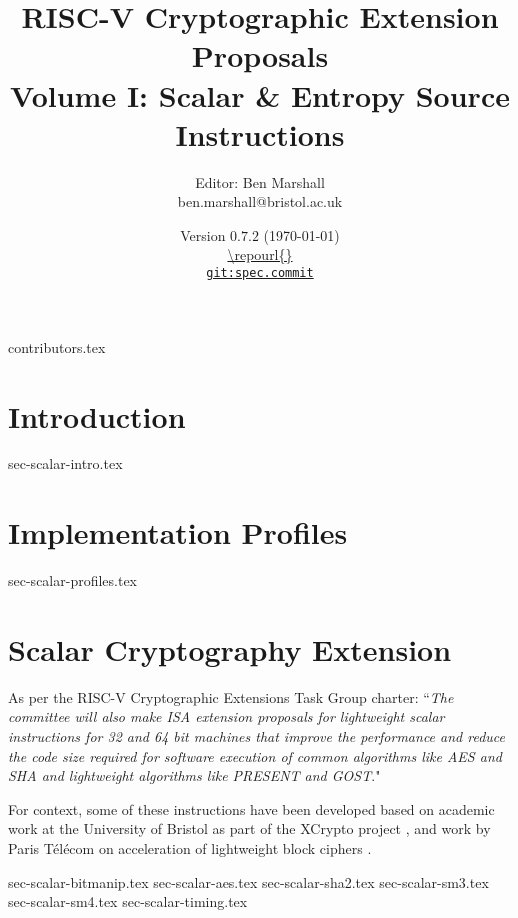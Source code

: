 \documentclass[11pt]{article}
\title{RISC-V Cryptographic Extension Proposals\\Volume I: Scalar \& Entropy Source Instructions}
\author{Editor: Ben Marshall\\ben.marshall@bristol.ac.uk}
\date{Version $0.7.2$ (\today) \\
\medskip
\url{\repourl{}} \\
\href{\repourl{}}{
{\small \tt git:{spec.commit}}}
}
\begin{document}

\maketitle

{contributors.tex}

\tableofcontents




\newpage
\section{Introduction}
\label{sec:intro}
{sec-scalar-intro.tex}

\newpage
\section{Implementation Profiles}
\label{sec:profiles}
{sec-scalar-profiles.tex}

\clearpage
\section{Scalar Cryptography Extension}
\label{sec:scalar}

As per the RISC-V Cryptographic Extensions Task Group charter:
``{\em The committee will also make ISA extension proposals for lightweight
scalar instructions for 32 and 64 bit machines that improve the performance
and reduce the code size required for software execution of common algorithms
like AES and SHA and lightweight algorithms like PRESENT and GOST}."

\bigskip

For context, some of these instructions have been developed based on academic
work at the University of Bristol as part of the XCrypto project
\cite{MPP:19},
and work by
Paris T\'{e}l\'{e}com on acceleration of lightweight block ciphers
\cite{TGMGD:19}.



{sec-scalar-bitmanip.tex}
{sec-scalar-aes.tex}
\clearpage
{sec-scalar-sha2.tex}
{sec-scalar-sm3.tex}
{sec-scalar-sm4.tex}
\clearpage
{sec-scalar-timing.tex}
\end{document}
